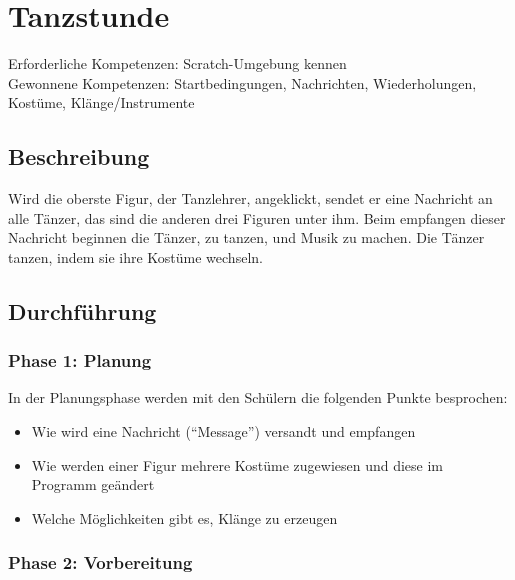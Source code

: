 \section{Tanzstunde}\label{tanzstunde}

Erforderliche Kompetenzen: Scratch-Umgebung kennen\\
Gewonnene Kompetenzen: Startbedingungen, Nachrichten, Wiederholungen,
Kostüme, Klänge/Instrumente

\begin{figure}[ht]
    \centering 
    \caption[\Sectionname]{\Sectionname}
\end{figure}

\subsection{Beschreibung}\label{beschreibung}

Wird die oberste Figur, der Tanzlehrer, angeklickt, sendet er eine
Nachricht an alle Tänzer, das sind die anderen drei Figuren unter ihm.
Beim empfangen dieser Nachricht beginnen die Tänzer, zu tanzen, und
Musik zu machen. Die Tänzer tanzen, indem sie ihre Kostüme wechseln.

\subsection{Durchführung}\label{durchfuxfchrung}

\subsubsection{Phase 1: Planung}\label{phase-1-planung}

In der Planungsphase werden mit den Schülern die folgenden Punkte
besprochen:

\begin{itemize}
\item
  Wie wird eine Nachricht (``Message'') versandt und empfangen
\item
  Wie werden einer Figur mehrere Kostüme zugewiesen und diese im
  Programm geändert
\item
  Welche Möglichkeiten gibt es, Klänge zu erzeugen
\end{itemize}

\subsubsection{Phase 2: Vorbereitung}\label{phase-2-vorbereitung}

